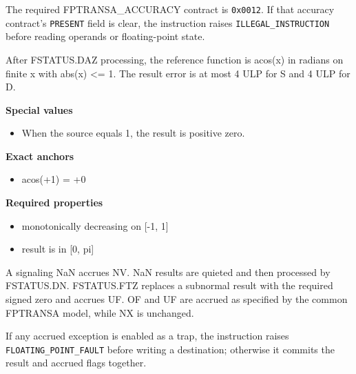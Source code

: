 The required FPTRANSA\_ACCURACY contract is \texttt{0x0012}. If that accuracy contract's \texttt{PRESENT} field is clear, the instruction raises \texttt{ILLEGAL\_INSTRUCTION} before reading operands or floating-point state.

After FSTATUS.DAZ processing, the reference function is acos(x) in radians on finite x with abs(x) \textless{}= 1. The result error is at most 4 ULP for S and 4 ULP for D.

\textbf{Special values}\par
\begin{itemize}
\item When the source equals 1, the result is positive zero.
\end{itemize}

\textbf{Exact anchors}\par
\begin{itemize}
\item acos(+1) = +0
\end{itemize}

\textbf{Required properties}\par
\begin{itemize}
\item monotonically decreasing on [-1, 1]
\item result is in [0, pi]
\end{itemize}

A signaling NaN accrues NV. NaN results are quieted and then processed by FSTATUS.DN. FSTATUS.FTZ replaces a subnormal result with the required signed zero and accrues UF. OF and UF are accrued as specified by the common FPTRANSA model, while NX is unchanged.

If any accrued exception is enabled as a trap, the instruction raises \texttt{FLOATING\_POINT\_FAULT} before writing a destination; otherwise it commits the result and accrued flags together.
